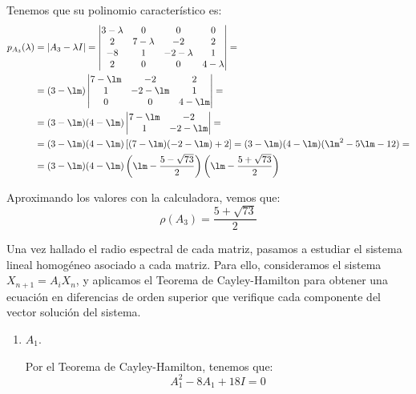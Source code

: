 \begin{ejercicio}
\begin{enumerate}
    Tenemos que su polinomio característico es:
    \begin{align*}
        p_{A_3}(\lambda) &= |A_3 - \lambda I| =
        \begin{vmatrix}
            3-\lambda & 0 & 0 & 0\\
            2 & 7-\lambda & -2 & 2\\
            -8 & 1 & -2-\lambda & 1\\
            2 & 0 & 0 & 4-\lambda
        \end{vmatrix}
        =\\&=
        (3-\lm)\begin{vmatrix}
            7-\lm & -2 & 2\\
            1 & -2-\lm & 1\\
            0 & 0 & 4-\lm
        \end{vmatrix}
        =\\&=
        (3-\lm)(4-\lm)\begin{vmatrix}
            7-\lm & -2\\
            1 & -2-\lm
        \end{vmatrix}
        =\\&= (3-\lm)(4-\lm)\left[(7-\lm)(-2-\lm) + 2\right]
        = (3-\lm)(4-\lm)(\lm^2 -5\lm - 12)
        =\\&= (3-\lm)(4-\lm)\left(\lm-\frac{5-\sqrt{73}}{2}\right)\left(\lm-\frac{5+\sqrt{73}}{2}\right)
    \end{align*}

    Aproximando los valores con la calculadora, vemos que:
    \begin{equation*}
        \rho(A_3) = \frac{5+\sqrt{73}}{2}
    \end{equation*}
\end{enumerate}

Una vez hallado el radio espectral de cada matriz, pasamos a estudiar el sistema lineal homogéneo asociado a cada matriz. Para ello, consideramos el sistema $X_{n+1} = A_iX_n$, y aplicamos el Teorema de Cayley-Hamilton para obtener una ecuación en diferencias de orden superior que verifique cada componente del vector solución del sistema.
\begin{enumerate}
    \item $A_1$.
    
    Por el Teorema de Cayley-Hamilton, tenemos que:
    \begin{equation*}
        A_1^2 - 8A_1 + 18I = 0
    \end{equation*}
    

\end{enumerate}
\end{ejercicio}
